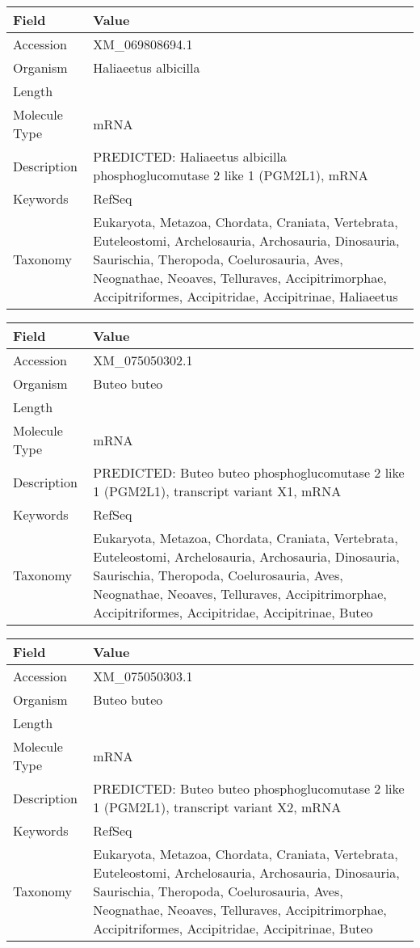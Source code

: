 \documentclass[10pt]{article}
\begin{document}
{\footnotesize
\begin{longtable}{>{\raggedright\arraybackslash}p{4.5cm} >{\raggedright\arraybackslash}p{11.5cm}}
\textbf{Field} & \textbf{Value} \\
\hline
Accession & XM\_069808694.1 \\
Organism & Haliaeetus albicilla \\
Length & 6441 \\
Molecule Type & mRNA \\
Description & PREDICTED: Haliaeetus albicilla phosphoglucomutase 2 like 1 (PGM2L1), mRNA \\
Keywords & RefSeq \\
Taxonomy & Eukaryota, Metazoa, Chordata, Craniata, Vertebrata, Euteleostomi, Archelosauria, Archosauria, Dinosauria, Saurischia, Theropoda, Coelurosauria, Aves, Neognathae, Neoaves, Telluraves, Accipitrimorphae, Accipitriformes, Accipitridae, Accipitrinae, Haliaeetus \\
\end{longtable}
}

{\footnotesize
\begin{longtable}{>{\raggedright\arraybackslash}p{4.5cm} >{\raggedright\arraybackslash}p{11.5cm}}
\textbf{Field} & \textbf{Value} \\
\hline
Accession & XM\_075050302.1 \\
Organism & Buteo buteo \\
Length & 6441 \\
Molecule Type & mRNA \\
Description & PREDICTED: Buteo buteo phosphoglucomutase 2 like 1 (PGM2L1), transcript variant X1, mRNA \\
Keywords & RefSeq \\
Taxonomy & Eukaryota, Metazoa, Chordata, Craniata, Vertebrata, Euteleostomi, Archelosauria, Archosauria, Dinosauria, Saurischia, Theropoda, Coelurosauria, Aves, Neognathae, Neoaves, Telluraves, Accipitrimorphae, Accipitriformes, Accipitridae, Accipitrinae, Buteo \\
\end{longtable}
}

{\footnotesize
\begin{longtable}{>{\raggedright\arraybackslash}p{4.5cm} >{\raggedright\arraybackslash}p{11.5cm}}
\textbf{Field} & \textbf{Value} \\
\hline
Accession & XM\_075050303.1 \\
Organism & Buteo buteo \\
Length & 6220 \\
Molecule Type & mRNA \\
Description & PREDICTED: Buteo buteo phosphoglucomutase 2 like 1 (PGM2L1), transcript variant X2, mRNA \\
Keywords & RefSeq \\
Taxonomy & Eukaryota, Metazoa, Chordata, Craniata, Vertebrata, Euteleostomi, Archelosauria, Archosauria, Dinosauria, Saurischia, Theropoda, Coelurosauria, Aves, Neognathae, Neoaves, Telluraves, Accipitrimorphae, Accipitriformes, Accipitridae, Accipitrinae, Buteo \\
\end{longtable}
}
\end{document}
